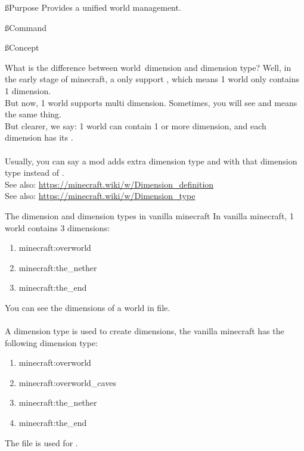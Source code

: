 
\ss{Purpose}
Provides a unified world management.

\ss{Command}

\ss{Concept}

\begin{example}{What is the difference between world\tcomma\ dimension and dimension type?}
    Well, in the early stage of minecraft, a  only support , which means 1 world only contains 1 dimension.\\
    But now, 1 world supports multi dimension.
    Sometimes, you will see  and  means the same thing.\\
    But clearer, we say: 1 world can contain 1 or more dimension, and each dimension has its .\\
    \\
    Usually, you can say a mod adds extra dimension type and  with that dimension type instead of .\\
    See also: \url{https://minecraft.wiki/w/Dimension_definition}\\
    See also: \url{https://minecraft.wiki/w/Dimension_type}
\end{example}

\begin{tips}{The dimension and dimension types in vanilla minecraft}
    In vanilla minecraft, 1 world contains 3 dimensions:
    \begin{enumerate}
        \item minecraft:overworld
        \item minecraft:the\_nether
        \item minecraft:the\_end
    \end{enumerate}
    You can see the dimensions of a world in  file.\\
    \\
    A dimension type is used to create dimensions, the vanilla minecraft has the following dimension type:
    \begin{enumerate}
        \item minecraft:overworld
        \item minecraft:overworld\_caves
        \item minecraft:the\_nether
        \item minecraft:the\_end
    \end{enumerate}

    The file  is used for .
\end{tips}

